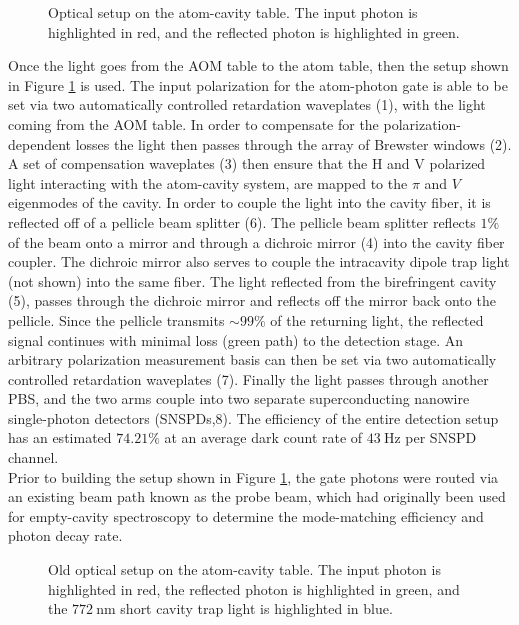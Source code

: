 \begin{figure}[htbp]
	\centering
	\makebox[\linewidth][c]{
		
	}
	\caption{Optical setup on the atom-cavity table. The input photon is highlighted in red, and the reflected photon is highlighted in green.}
	\label{fig:setup_cavity_table}
\end{figure}

Once the light goes from the AOM table to the atom table, then the setup shown in Figure \ref{fig:setup_cavity_table} is used. The input polarization for the atom-photon gate is able to be set via two automatically controlled retardation waveplates (1), with the light coming from the AOM table. In order to compensate for the polarization-dependent losses the light then passes through the array of Brewster windows (2). A set of compensation waveplates (3) then ensure that the H and V polarized light interacting with the atom-cavity system, are mapped to the $\pi$ and $V$ eigenmodes of the cavity. In order to couple the light into the cavity fiber, it is reflected off of a pellicle beam splitter (6). The pellicle beam splitter reflects $1\%$ of the beam onto a mirror and through a dichroic mirror (4) into the cavity fiber coupler. The dichroic mirror also serves to couple the intracavity dipole trap light (not shown) into the same fiber. The light reflected from the birefringent cavity (5), passes through the dichroic mirror and reflects off the mirror back onto the pellicle. Since the pellicle transmits $\sim99\%$ of the returning light, the reflected signal continues with minimal loss (green path) to the detection stage. An arbitrary polarization measurement basis can then be set via two automatically controlled retardation waveplates (7). Finally the light passes through another PBS, and the two arms couple into two separate superconducting nanowire single-photon detectors (SNSPDs,8). The efficiency of the entire detection setup has an estimated $74.21\%$ at an average dark count rate of $\SI{43}{\hertz}$ per SNSPD channel. \\

Prior to building the setup shown in Figure \ref{fig:setup_cavity_table}, the gate photons were routed via an existing beam path known as the probe beam, which had originally been used for empty-cavity spectroscopy to determine the mode-matching efficiency and photon decay rate.

\begin{figure}[htbp]
	\centering
	
	\caption{Old optical setup on the atom-cavity table. The input photon is highlighted in red, the reflected photon is highlighted in green, and the $\SI{772}{\nano\metre}$ short cavity trap light is highlighted in blue.}
	\label{fig:old_setup_cavity_table}
\end{figure}


